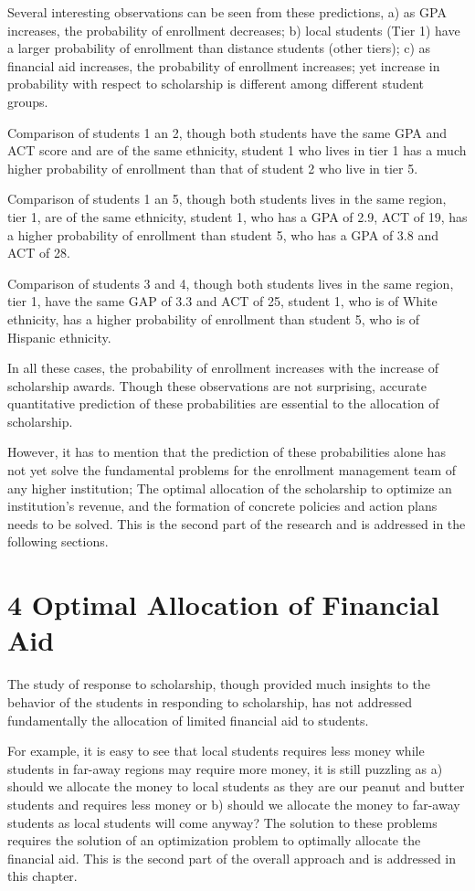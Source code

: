 \documentclass[12pt,english]{report}
\begin{document}
Several interesting observations can be seen from these predictions, a) as GPA increases, the probability of enrollment decreases; b) local students (Tier 1) have a larger probability of enrollment than distance students (other tiers); c) as financial aid increases, the probability of enrollment increases; yet increase in probability with respect to scholarship is different among different student groups. 

Comparison of students 1 an 2, though both students have the same GPA and ACT score and are of the same ethnicity, student 1 who lives in tier 1 has a much higher probability of enrollment than that of student 2 who live in tier 5. 

Comparison of students 1 an 5, though both students lives in the same region, tier 1, are of the same ethnicity, student 1, who has a GPA of 2.9, ACT of 19, has a higher probability of enrollment than student 5, who has a GPA of 3.8 and ACT of 28.

Comparison of students 3 and 4, though both students lives in the same region, tier 1, have the same GAP of 3.3 and ACT of 25, student 1, who is of White ethnicity, has a higher probability of enrollment than student 5, who is of Hispanic ethnicity.

In all these cases, the probability of enrollment increases with the increase of scholarship awards. Though these observations are not surprising, accurate quantitative prediction of these probabilities are essential to the allocation of scholarship. 

However, it has to mention that the prediction of these probabilities alone has not yet solve the fundamental problems for the enrollment management team of any higher institution;  The optimal allocation of the scholarship to optimize an institution's revenue, and the formation of concrete policies and action plans needs to be solved. This is the second part of the research and is addressed in the following sections.


\chapter{4 Optimal Allocation of Financial Aid }

The study of response to scholarship, though provided much insights to the behavior of the students in responding to scholarship, has not addressed fundamentally the allocation of limited financial aid to students.  

For example, it is easy to see that local students requires less money while students in far-away regions may require more money, it is still puzzling as a) should we allocate the money to local students as they are our peanut and butter students and requires less money or b) should we allocate the money to far-away students as local students will come anyway? The solution to these problems requires the solution of an optimization problem to optimally allocate the financial aid.  This is the second part of the overall approach and is addressed in this chapter. 
\end{document}
